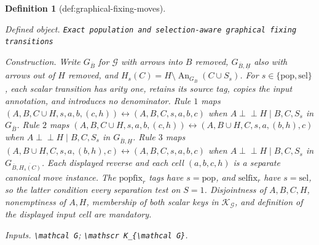 \documentclass{article}
\newtheorem{definition}{Definition}
\begin{document}
\begin{definition}[def:graphical-fixing-moves]\label{def:graphical-fixing-moves}
\par\smallskip\noindent\emph{Defined object.} \texttt{Exact population and selection-\allowbreak{}aware graphical fixing transitions}
\par\smallskip\noindent\emph{Construction.} Write \(G_{\overline B}\) for \(\mathcal G\) with arrows into \(B\) removed, \(G_{\overline B,\underline H}\) also with arrows out of \(H\) removed, and \(H_s(C)=H\setminus\operatorname{An}_{G_{\overline B}}(C\cup S_s)\). For \(s\in\{\mathrm{pop},\mathrm{sel}\}\), each scalar transition has arity one, retains its source tag, copies the input annotation, and introduces no denominator. Rule \(1\) maps \((A,B,C\cup H,s,a,b,(c,h))\leftrightarrow(A,B,C,s,a,b,c)\) when \(A\perp\!\!\!\perp H\mid B,C,S_s\) in \(G_{\overline B}\). Rule \(2\) maps \((A,B,C\cup H,s,a,b,(c,h))\leftrightarrow(A,B\cup H,C,s,a,(b,h),c)\) when \(A\perp\!\!\!\perp H\mid B,C,S_s\) in \(G_{\overline B,\underline H}\). Rule \(3\) maps \((A,B\cup H,C,s,a,(b,h),c)\leftrightarrow(A,B,C,s,a,b,c)\) when \(A\perp\!\!\!\perp H\mid B,C,S_s\) in \(G_{\overline B,\overline{H_s(C)}}\). Each displayed reverse and each cell \((a,b,c,h)\) is a separate canonical move instance. The \(\mathrm{popfix}_r\) tags have \(s=\mathrm{pop}\), and \(\mathrm{selfix}_r\) have \(s=\mathrm{sel}\), so the latter condition every separation test on \(S=1\). Disjointness of \(A,B,C,H\), nonemptiness of \(A,H\), membership of both scalar keys in \(\mathscr K_{\mathcal G}\), and definition of the displayed input cell are mandatory.
\par\smallskip\noindent\emph{Inputs.} \texttt{\textbackslash{}\allowbreak{}mathcal G}; \texttt{\textbackslash{}\allowbreak{}mathscr K\_\allowbreak{}\{\textbackslash{}\allowbreak{}mathcal G\}\allowbreak{}}.
\end{definition}
\end{document}
